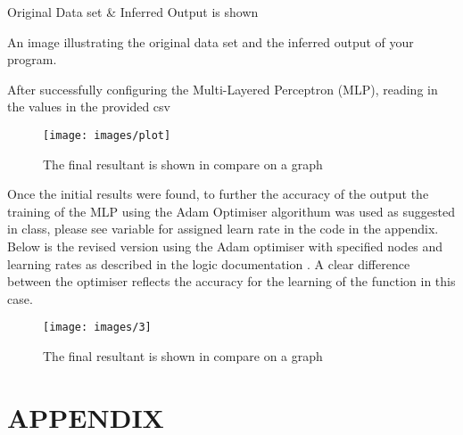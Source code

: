 \documentclass[a4paper, 10pt]{IEEEconf}
\begin{document}
Original Data set \& Inferred Output is shown 

An image illustrating the original data set and the inferred output of your program.

After successfully configuring the Multi-Layered Perceptron (MLP), reading in the values in the provided csv

\begin{figure}[H]
  \texttt{[image: images/plot]}
  \caption{The final resultant is shown in compare on a graph}
  \label{fig:The final resultant is shown in compare on a graph}
\end{figure}

Once the initial results were found, to further the accuracy of the output the training of the MLP using the Adam Optimiser algorithum was used as suggested in class, please see variable for assigned learn rate in the code in the appendix. Below is the revised version using the Adam optimiser with specified nodes and learning rates as described in the logic documentation \cite{adam}. A clear difference between the optimiser reflects the accuracy for the learning of the function in this case.

\begin{figure}[H]
  \texttt{[image: images/3]}
  \caption{The final resultant is shown in compare on a graph}
  \label{fig:The final resultant is shown in compare on a graph}
\end{figure}



\clearpage
\onecolumn
\section*{APPENDIX}
\begin{lstlisting}[language = Python]

\end{lstlisting}
\end{document}
